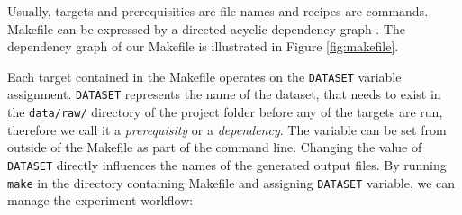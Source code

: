  Usually, targets and prerequisities are file names and recipes are commands. Makefile can be expressed by a directed acyclic dependency graph \cite{feldman1979make}. The dependency graph of our Makefile is illustrated in Figure \ref{fig:makefile}. 
 
 Each target contained in the Makefile operates on the \texttt{DATASET} variable assignment. \texttt{DATASET} represents the name of the dataset, that needs to exist in the \texttt{data/raw/} directory of the project folder before any of the targets are run, therefore we call it a \textit{prerequisity} or a \textit{dependency}. The variable can be set from outside of the Makefile as part of the command line. Changing the value of \texttt{DATASET} directly influences the names of the generated output files. By running \texttt{make} in the directory containing Makefile and assigning \texttt{DATASET} variable, we can manage the experiment workflow:
 
